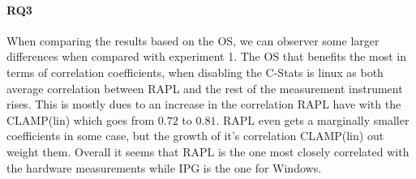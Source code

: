 \paragraph{RQ3}
When comparing the results based on the OS, we can observer some larger differences when compared with experiment 1. The OS that benefits the most in terms of correlation coefficients, when disabling the C-Stats is linux as both average correlation between RAPL and the rest of the measurement instrument rises. This is mostly dues to an increase in the correlation RAPL have with the CLAMP(lin) which goes from $0.72$ to $0.81$. RAPL even gets a marginally smaller coefficients in some case, but the growth of it's correlation CLAMP(lin) out weight them.  Overall it seems that RAPL is the one most closely correlated with the hardware measurements while IPG is the one for Windows.





%  


% 

% 


